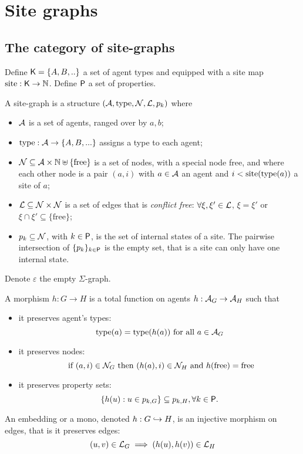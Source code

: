 \section{Site graphs}

\subsection{The category of site-graphs}

Define $\mathsf{K} = \{A, B,..\}$ a set of agent types %
and equipped with a site map $\operatorname{site}:\mathsf{K}\to\mathbb{N}$.
Define $\mathsf{P}$ a set of properties.


\begin{definition}
\label{def:site_graphs}
A site-graph is a structure $(\mathcal{A},\operatorname{type},\mathcal{N},\mathcal{L},p_k)$ where
\begin{itemize}
\item $\mathcal{A}$ is a set of agents, ranged over by $a,b$;
\item $\operatorname{type}:\mathcal{A}\to \{A, B,...\}$ assigns a type to each agent;
\item $\mathcal{N}\subseteq \mathcal{A}\times\mathbb{N}\uplus\{\text{free}\}$ is a set of nodes, with a special node free, and where each other node is a pair $(a,i)$ with $a\in\mathcal{A}$ an agent and $i<\operatorname{site}(\operatorname{type}(a))$ a site of $a$;
\item $\mathcal{L}\subseteq \mathcal{N}\times\mathcal{N}$ is a set of edges that is \emph{conflict free}: $\forall \xi,\xi'\in\mathcal{L}$, $\xi=\xi'$ or $\xi\cap \xi' \subseteq \{\text{free}\}$;
\item $p_k\subseteq\mathcal{N}$, with $k\in\mathsf{P}$, is the set of internal states of a site. The pairwise intersection of $\{p_k\}_{k\in\mathsf{P}}$ is the empty set, that is a site can only have one internal state.
\end{itemize}
Denote $\varepsilon$ the empty $\Sigma$-graph.
\end{definition}

\begin{definition}
\label{def:site_morph}
A morphism $h:G\to H$ is a total function on agents $h:\mathcal{A}_G\to\mathcal{A}_H$ such that
\begin{itemize}
\item it preserves agent's types:
\[
\operatorname{type}(a) = \operatorname{type}(h(a)) \text{ for all }a \in \mathcal{A}_G
\]
\item it preserves nodes:
\[
\text{ if }(a,i)\in \mathcal{N}_G \text{ then }(h(a),i) \in \mathcal{N}_H\text{ and }h(\text{free})=\text{free}
\]
\item it preserves property sets:
\[
\{h(u) : u\in p_{k,G}\} \subseteq p_{k,H}, \forall k\in\mathsf{P}.
\]
\end{itemize}
An embedding or a mono, denoted $h:G\hookrightarrow H$, is an injective morphism on edges, that is it preserves edges:
\[
(u,v)\in\mathcal{L}_G \implies (h(u),h(v))\in\mathcal{L}_H
\]
\end{definition}

